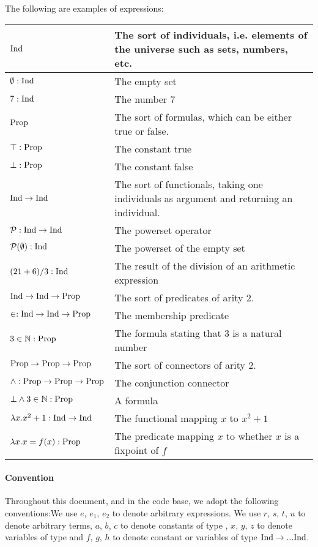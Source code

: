 \begin{example}
  The following are examples of expressions:
  \begin{tabularx}{\textwidth}{|l | X|}\hline
    $\text{Ind}$ & The sort of individuals, i.e. elements of the universe such as sets, numbers, etc. \\\hline
    $\emptyset: \text{Ind}$ & The empty set \\\hline
    $7: \text{Ind}$ & The number 7 \\\hline
    $\text{Prop}$ & The sort of formulas, which can be either true or false. \\\hline
    $\top: \text{Prop}$ & The constant true \\\hline
    $\bot: \text{Prop}$ & The constant false \\\hline
    $\text{Ind} \rightarrow \text{Ind}$ & The sort of functionals, taking one individuals as argument and returning an individual. \\\hline
    $\mathcal P: \text{Ind} \rightarrow \text{Ind}$  & The powerset operator \\\hline
    $\mathcal P(\emptyset): \text{Ind}$ & The powerset of the empty set \\\hline
    $(21 + 6) / 3: \text{Ind}$ & The result of the division of an arithmetic expression \\\hline
    $\text{Ind} \rightarrow \text{Ind} \rightarrow \text{Prop}$ & The sort of predicates of arity 2. \\\hline
    $\in: \text{Ind} \rightarrow \text{Ind} \rightarrow \text{Prop}$ & The membership predicate \\\hline
    $3 \in \mathbb N : \text{Prop}$ & The formula stating that 3 is a natural number \\\hline
    $\text{Prop} \rightarrow \text{Prop} \rightarrow \text{Prop}$ & The sort of connectors of arity 2.\\\hline
    $\land: \text{Prop} \rightarrow \text{Prop} \rightarrow \text{Prop}$ & The conjunction connector \\\hline
    $\bot \land 3 \in \mathbb N: \text{Prop}$ & A formula \\\hline

    $\lambda x. x^2+1: \text{Ind} \rightarrow \text{Ind}$ & The functional mapping $x$ to $x^2+1$ \\\hline
    $\lambda x. x = f(x): \text{Prop}$ & The predicate mapping $x$ to whether $x$ is a fixpoint of $f$ \\\hline
  \end{tabularx}
\end{example}

\paragraph{Convention} Throughout this document, and in the code base, we adopt the following conventions:We use $e$, $e_1$, $e_2$ to denote arbitrary expressions.
We use $r$, $s$, $t$, $u$ to denote arbitrary terms, $a$, $b$, $c$ to denote constants of type \Ind, $x$, $y$, $z$ to denote variables of type \Ind and $f$, $g$, $h$ to denote constant or variables of type $\text{Ind} \rightarrow ... \text{Ind}$.

